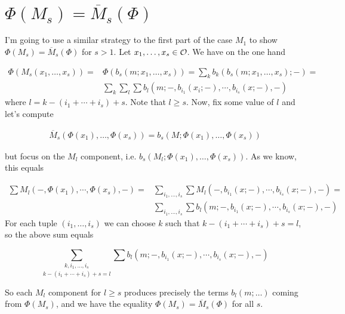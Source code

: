 \documentclass[twoside]{article}
\begin{document}
\section{$\Phi(M_s)=\overline{M}_s(\Phi)$}

I'm going to use a similar strategy to the first part of the case $M_1$ to show $\Phi(M_s)=\overline{M}_s(\Phi)$ for $s>1$. Let $x_1,\dots, x_s\in{\mathcal O}$. We have on the one hand

\begin{align*}
\Phi(M_s(x_1,\dots, x_s))=&\Phi(b_s(m;x_1,\dots, x_s))=\sum_k b_k(b_s(m;x_1,\dots, x_s);-)=\\
&\sum_k\sum_l\sum b_l(m; -, b_{i_1}(x_i;-),\cdots,b_{i_s}(x;-),-)
\end{align*}
where $l=k-(i_1+\cdots+i_s)+s$. Note that $l\geq s$. Now, fix some value of $l$ and let's compute

\begin{align*}
\overline{M}_s(\Phi(x_1),\dots, \Phi(x_s))=b_s(M;\Phi(x_1),\dots, \Phi(x_s))
\end{align*}

but focus on the $M_l$ component, i.e. $b_s(M_l;\Phi(x_1),\dots, \Phi(x_s))$. As we know, this equals

\begin{align*}
\sum M_l(-,\Phi(x_1),\cdots, \Phi(x_s),-)=&\sum_{i_1,\dots, i_s}\sum M_l(-,b_{i_1}(x;-),\cdots,b_{i_s}(x;-),-)=\\
&\sum_{i_1,\dots, i_s}\sum b_l(m;-,b_{i_1}(x;-),\cdots,b_{i_s}(x;-),-)
\end{align*}
For each tuple $(i_1,\dots, i_s)$ we can choose $k$ such that $k-(i_1+\cdots+i_s)+s=l$, so the above sum equals

$$\underset{k-(i_1+\cdots+i_s)+s=l}{\sum_{k,i_1,\dots, i_s}}\sum b_l(m;-,b_{i_1}(x;-),\cdots,b_{i_s}(x;-),-)$$

So each $M_l$ component for $l\geq s$ produces precisely the terms $b_l(m;\dots)$ coming from $\Phi(M_s)$, and we have the equality $\Phi(M_s)=\overline{M}_s(\Phi)$ for all $s$.


\end{document}

